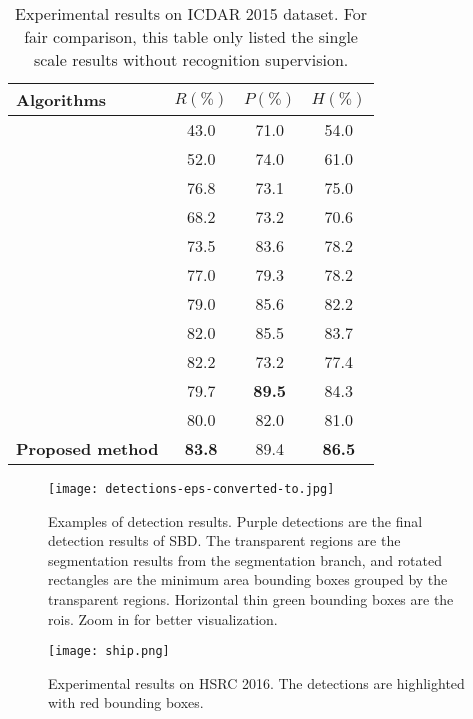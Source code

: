 \documentclass{article}
\begin{document}
\begin{table}[!t]
\centering
\small
\begin{tabular}{lccc}
  \hline
  Algorithms  & $R (\%)$  & $P (\%)$ & $H (\%)$ \\
  \hline
  \cite{zhang2016multi} & 43.0 & 71.0 & 54.0\\
  \cite{tian2016detecting} & 52.0 & 74.0 & 61.0\\
  \cite{shi2017detecting} & 76.8  & 73.1 & 75.0\\
  \cite{liu2017deep} & 68.2 & 73.2 & 70.6\\
  \cite{zhou2017east} & 73.5 & 83.6 & 78.2\\
  \cite{hu2017wordsup} & 77.0 & 79.3 & 78.2\\
  \cite{liao2018rotation} & 79.0 & 85.6 & 82.2\\
  \cite{deng2018pixellink} & 82.0 & 85.5 & 83.7\\
  \cite{ma2018arbitrary} & 82.2 & 73.2 & 77.4\\
  \cite{lyu2018multi} & 79.7 & {\bf 89.5} & 84.3\\
  \cite{he2017deep} & 80.0 & 82.0 & 81.0 \\
  \hline
  {\bf Proposed method} & {\bf 83.8} & 89.4 & {\bf 86.5}\\
  \hline
\end{tabular}
\caption{Experimental results on ICDAR 2015 dataset. For fair comparison, this table only listed the single scale results without recognition supervision.}
\label{tab:ic15}
\end{table}

\begin{figure}[!t]
  \centering
  \centerline{\texttt{[image: detections-eps-converted-to.jpg]}}
  \caption{Examples of detection results. Purple detections are the final detection results of SBD. The transparent regions are the segmentation results from the segmentation branch, and rotated rectangles are the minimum area bounding boxes grouped by the transparent regions. Horizontal thin green bounding boxes are the rois. Zoom in for better visualization.}\label{fig:dettext}
\end{figure}

\begin{figure}[htb]
  \centering
  \centerline{\texttt{[image: ship.png]}}
  \caption{ Experimental results on HSRC 2016. The detections are highlighted with red bounding boxes. }\label{fig:shipdet}
\end{figure}
\end{document}

